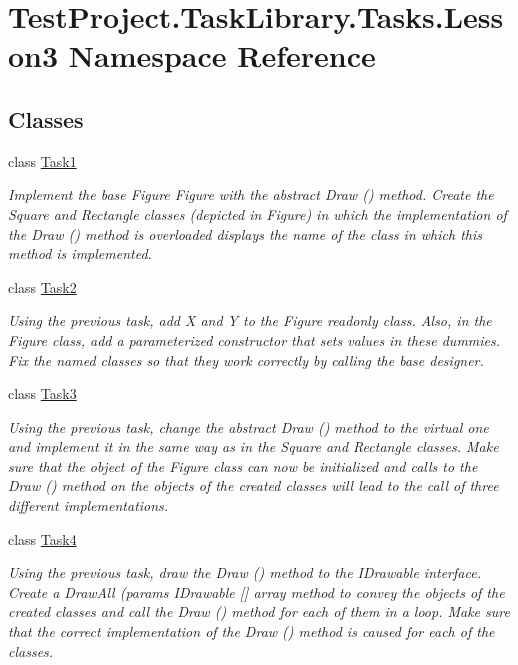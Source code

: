 \hypertarget{namespace_test_project_1_1_task_library_1_1_tasks_1_1_lesson3}{}\section{Test\+Project.\+Task\+Library.\+Tasks.\+Lesson3 Namespace Reference}
\label{namespace_test_project_1_1_task_library_1_1_tasks_1_1_lesson3}
\subsection*{Classes}
\begin{DoxyCompactItemize}
\item 
class \mbox{\hyperlink{class_test_project_1_1_task_library_1_1_tasks_1_1_lesson3_1_1_task1}{Task1}}
\begin{DoxyCompactList}\small\item\em Implement the base Figure Figure with the abstract Draw () method. Create the Square and Rectangle classes (depicted in Figure) in which the implementation of the Draw () method is overloaded displays the name of the class in which this method is implemented. \end{DoxyCompactList}\item 
class \mbox{\hyperlink{class_test_project_1_1_task_library_1_1_tasks_1_1_lesson3_1_1_task2}{Task2}}
\begin{DoxyCompactList}\small\item\em Using the previous task, add X and Y to the Figure readonly class. Also, in the Figure class, add a parameterized constructor that sets values in these dummies. Fix the named classes so that they work correctly by calling the base designer. \end{DoxyCompactList}\item 
class \mbox{\hyperlink{class_test_project_1_1_task_library_1_1_tasks_1_1_lesson3_1_1_task3}{Task3}}
\begin{DoxyCompactList}\small\item\em Using the previous task, change the abstract Draw () method to the virtual one and implement it in the same way as in the Square and Rectangle classes. Make sure that the object of the Figure class can now be initialized and calls to the Draw () method on the objects of the created classes will lead to the call of three different implementations. \end{DoxyCompactList}\item 
class \mbox{\hyperlink{class_test_project_1_1_task_library_1_1_tasks_1_1_lesson3_1_1_task4}{Task4}}
\begin{DoxyCompactList}\small\item\em Using the previous task, draw the Draw () method to the I\+Drawable interface. Create a Draw\+All (params I\+Drawable \mbox{[}\mbox{]} array method to convey the objects of the created classes and call the Draw () method for each of them in a loop. Make sure that the correct implementation of the Draw () method is caused for each of the classes. \end{DoxyCompactList}\end{DoxyCompactItemize}
